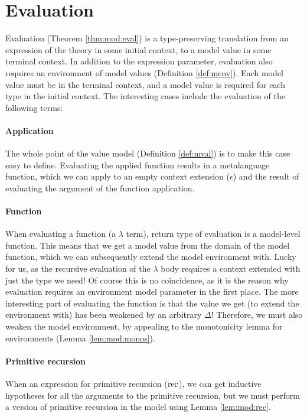 \documentclass{llncs}
\newcommand{\refdef}[1]{Definition \ref{def:#1}}
\newcommand{\refthm}[1]{Theorem \ref{thm:#1}}
\newcommand{\reflem}[1]{Lemma \ref{lem:#1}}
\def\lam{\lambda}
\def\emp{\epsilon}
\def\rec{\fun{rec}}
\newcommand{\fun}[1]{\textmd{#1}}
\begin{document}
\section*{\appendixname}
\appendix

\section{Evaluation}

Evaluation (\refthm{mod:eval}) is a type-preserving translation from
an expression of the theory in some initial context, to a model value
in some terminal context. In addition to the expression parameter,
evaluation also requires an environment of model values
(\refdef{menv}). Each model value must be in the terminal context, and
a model value is required for each type in the initial context.
The interesting cases include the evaluation of the following terms:

\paragraph{Application} The whole point of the value model
(\refdef{mval}) is to make this case easy to define. Evaluating the
applied function results in a metalanguage function, which we can
apply to an empty context extension ($\emp$) and the result of
evaluating the argument of the function application.

\paragraph{Function} When evaluating a function (a $\lam$ term),
return type of evaluation is a model-level function. This means that
we get a model value from the domain of the model function, which we
can subsequently extend the model environment with. Lucky for us, as
the recursive evaluation of the $\lam$ body requires a context extended
with just the type we need! Of course this is no coincidence, as it is
the reason why evaluation requires an environment model parameter in
the first place. The more interesting part of evaluating the function
is that the value we get (to extend the environment with) has been
weakened by an arbitrary $\Delta$! Therefore, we must also weaken the
model environment, by appealing to the monotonicity lemma for
environments (\reflem{mod:monos}).

\paragraph{Primitive recursion} When an expression for primitive
recursion ($\rec$), we can get inductive hypotheses for all the
arguments to the primitive recursion, but we must perform a version of
primitive recursion in the model using \reflem{mod:rec}.
\end{document}
